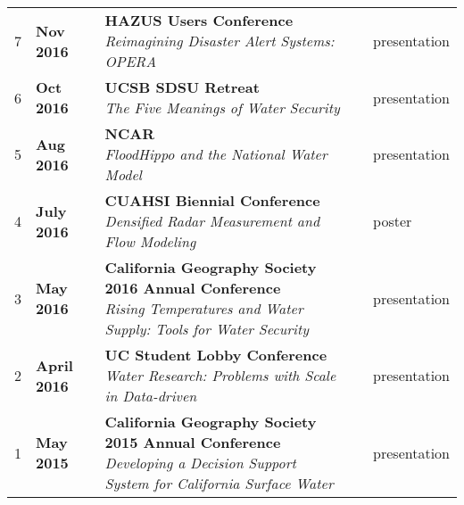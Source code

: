 \documentclass{article}
\begin{document}
\begin{longtable}{rp{2.5cm}P{8.5cm}p{1cm}P{2cm}}
  7 & \textbf{Nov 2016 } & {\textbf{HAZUS Users Conference} \newline \textit{Reimagining Disaster Alert Systems: OPERA } } &  & presentation \\ 
  6 & \textbf{Oct 2016 } & {\textbf{UCSB SDSU Retreat} \newline \textit{The Five Meanings of Water Security } } &  & presentation \\ 
  5 & \textbf{Aug 2016 } & {\textbf{NCAR} \newline \textit{FloodHippo and the National Water Model } } &  & presentation \\ 
  4 & \textbf{July 2016 } & {\textbf{CUAHSI Biennial Conference} \newline \textit{Densified Radar Measurement and Flow Modeling } } &  & poster \\ 
  3 & \textbf{May 2016 } & {\textbf{California Geography Society 2016 Annual Conference} \newline \textit{Rising Temperatures and Water Supply: Tools for Water Security } } &  & presentation \\ 
  2 & \textbf{April 2016 } & {\textbf{UC Student Lobby Conference} \newline \textit{Water Research: Problems with Scale in Data-driven } } &  & presentation \\ 
  1 & \textbf{May 2015 } & {\textbf{California Geography Society 2015 Annual Conference} \newline \textit{Developing a Decision Support System for California Surface Water } } &  & presentation \\ 
  \end{longtable}


\end{document}
